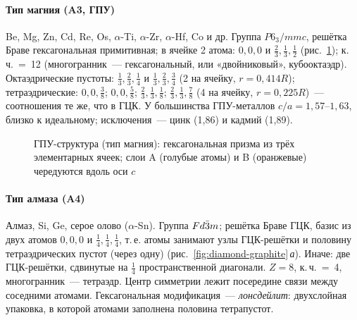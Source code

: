 \paragraph{Тип магния (A3, ГПУ)}
Be, Mg, Zn, Cd, Re, Os, $\alpha$-Ti, $\alpha$-Zr, $\alpha$-Hf, Co и др. Группа
$P6_3/mmc$, решётка Браве гексагональная примитивная; в ячейке 2 атома:
$0,0,0$ и $\frac23,\frac13,\frac12$ (рис.~\ref{fig:hcp}); к.\,ч.~=~12
(многогранник~— гексагональный, или «двойниковый», кубооктаэдр).
Октаэдрические пустоты: $\frac13,\frac23,\frac14$ и $\frac13,\frac23,\frac34$ (2 на ячейку,
$r=0{,}414R$); тетраэдрические: $0,0,\frac38$; $0,0,\frac58$; $\frac23,\frac13,\frac18$;
$\frac23,\frac13,\frac78$ (4 на ячейку, $r=0{,}225R$)~— соотношения те же, что в ГЦК.
У большинства ГПУ-металлов $c/a=1{,}57$--$1{,}63$, близко к идеальному;
исключения~— цинк (1,86) и кадмий (1,89).

\begin{figure}[ht]
\centering
{}
\caption{ГПУ-структура (тип магния): гексагональная призма из трёх
элементарных ячеек; слои A (голубые атомы) и B (оранжевые) чередуются
вдоль оси $c$}
\label{fig:hcp}
\end{figure}

\paragraph{Тип алмаза (A4)}
Алмаз, Si, Ge, серое олово ($\alpha$-Sn). Группа $Fd\bar{3}m$; решётка Браве ГЦК,
базис из двух атомов $0,0,0$ и $\frac14,\frac14,\frac14$, т.\,е. атомы занимают узлы
ГЦК-решётки и половину тетраэдрических пустот (через одну)
(рис.~\ref{fig:diamond-graphite}\,\textit{а}). Иначе: две ГЦК-решётки,
сдвинутые на $\frac14$ пространственной диагонали. $Z=8$, к.\,ч.~=~4,
многогранник~— тетраэдр. Центр симметрии лежит посередине связи между соседними
атомами. Гексагональная модификация~— \emph{лонсдейлит}: двухслойная
упаковка, в которой атомами заполнена половина тетрапустот.

